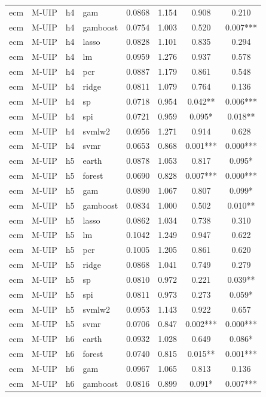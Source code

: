 \begin{ThreePartTable}
\begin{longtable}[t]{llclcccc}
ecm & M-UIP & h4 & gam & 0.0868 & 1.154 & 0.908 & 0.210\\
ecm & M-UIP & h4 & gamboost & 0.0754 & 1.003 & 0.520 & 0.007***\\
ecm & M-UIP & h4 & lasso & 0.0828 & 1.101 & 0.835 & 0.294\\
ecm & M-UIP & h4 & lm & 0.0959 & 1.276 & 0.937 & 0.578\\
ecm & M-UIP & h4 & pcr & 0.0887 & 1.179 & 0.861 & 0.548\\
ecm & M-UIP & h4 & ridge & 0.0811 & 1.079 & 0.764 & 0.136\\
ecm & M-UIP & h4 & sp & 0.0718 & 0.954 & 0.042** & 0.006***\\
ecm & M-UIP & h4 & spi & 0.0721 & 0.959 & 0.095* & 0.018**\\
ecm & M-UIP & h4 & svmlw2 & 0.0956 & 1.271 & 0.914 & 0.628\\
ecm & M-UIP & h4 & svmr & 0.0653 & 0.868 & 0.001*** & 0.000***\\
\addlinespace
ecm & M-UIP & h5 & earth & 0.0878 & 1.053 & 0.817 & 0.095*\\
ecm & M-UIP & h5 & forest & 0.0690 & 0.828 & 0.007*** & 0.000***\\
ecm & M-UIP & h5 & gam & 0.0890 & 1.067 & 0.807 & 0.099*\\
ecm & M-UIP & h5 & gamboost & 0.0834 & 1.000 & 0.502 & 0.010**\\
ecm & M-UIP & h5 & lasso & 0.0862 & 1.034 & 0.738 & 0.310\\
ecm & M-UIP & h5 & lm & 0.1042 & 1.249 & 0.947 & 0.622\\
ecm & M-UIP & h5 & pcr & 0.1005 & 1.205 & 0.861 & 0.620\\
ecm & M-UIP & h5 & ridge & 0.0868 & 1.041 & 0.749 & 0.279\\
ecm & M-UIP & h5 & sp & 0.0810 & 0.972 & 0.221 & 0.039**\\
ecm & M-UIP & h5 & spi & 0.0811 & 0.973 & 0.273 & 0.059*\\
ecm & M-UIP & h5 & svmlw2 & 0.0953 & 1.143 & 0.922 & 0.657\\
ecm & M-UIP & h5 & svmr & 0.0706 & 0.847 & 0.002*** & 0.000***\\
\addlinespace
ecm & M-UIP & h6 & earth & 0.0932 & 1.028 & 0.649 & 0.086*\\
ecm & M-UIP & h6 & forest & 0.0740 & 0.815 & 0.015** & 0.001***\\
ecm & M-UIP & h6 & gam & 0.0967 & 1.065 & 0.813 & 0.136\\
ecm & M-UIP & h6 & gamboost & 0.0816 & 0.899 & 0.091* & 0.007***\\

\end{longtable}
\end{ThreePartTable}
